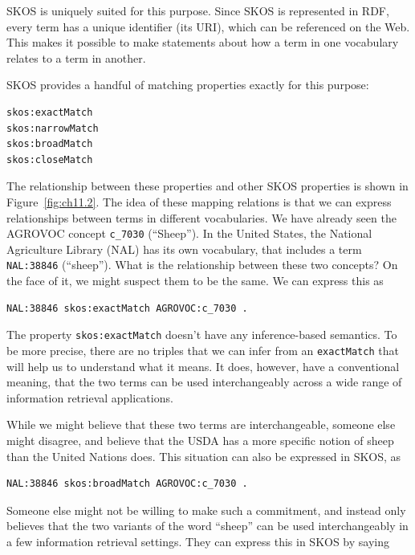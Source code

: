 SKOS is uniquely suited for this purpose. Since SKOS is represented in
RDF, every term has a unique identifier (its URI), which can be
referenced on the Web. This makes it possible to make statements about
how a term in one vocabulary relates to a term in another.

SKOS provides a handful of matching properties exactly for this purpose:

\begin{lstlisting}
skos:exactMatch
skos:narrowMatch 
skos:broadMatch 
skos:closeMatch
\end{lstlisting}

The relationship between these properties and other SKOS properties is
shown in Figure~\ref{fig:ch11.2}. The idea of these mapping relations is that we can
express relationships between terms in different
vocabularies. We have already seen the AGROVOC concept \texttt{c\_7030}
(``Sheep''). In the United States, the National Agriculture Library
(NAL) has its own vocabulary, that includes a term \texttt{NAL:38846}
(``sheep''). What is the relationship between these two concepts? On the
face of it, we might suspect them to be the same. We can express this as

\begin{lstlisting}
NAL:38846 skos:exactMatch AGROVOC:c_7030 .
\end{lstlisting}

The property \texttt{skos:exactMatch} doesn't have any inference-based semantics.
To be more precise, there are no triples that we can infer from an
\texttt{exactMatch} that will help us to understand what it means. It does,
however, have a conventional meaning, that the two terms can be used
interchangeably across a wide range of information retrieval
applications.

While we might believe that these two terms are interchangeable, someone
else might disagree, and believe that the USDA has a more specific
notion of sheep than the United Nations does. This situation can also be
expressed in SKOS, as

\begin{lstlisting}
NAL:38846 skos:broadMatch AGROVOC:c_7030 .
\end{lstlisting}

Someone else might not be willing to make such a commitment, and instead
only believes that the two variants of the word ``sheep'' can be used
interchangeably in a few information retrieval settings. They can
express this in SKOS by saying

